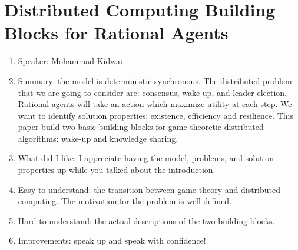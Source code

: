 \documentclass[twoside]{article}
\begin{document}
\section{Distributed Computing Building Blocks for Rational Agents}
\begin{enumerate}
\item Speaker: Mohammad Kidwai
\item Summary: the model is deterministic synchronous. The distributed problem that we are going to consider are: consensus, wake up, and leader election. Rational agents will take an action which maximize utility at each step. We want to identify solution properties: existence, efficiency and resilience. This paper build two basic building blocks for game theoretic distributed algorithms: wake-up and knowledge sharing.
\item What did I like: I appreciate having the model, problems, and solution properties up while you talked about the introduction.
\item Easy to understand: the transition between game theory and distributed computing. The motivation for the problem is well defined.
\item Hard to understand: the actual descriptions of the two building blocks.
\item Improvements: speak up and speak with confidence! 
\end{enumerate}
\end{document}
